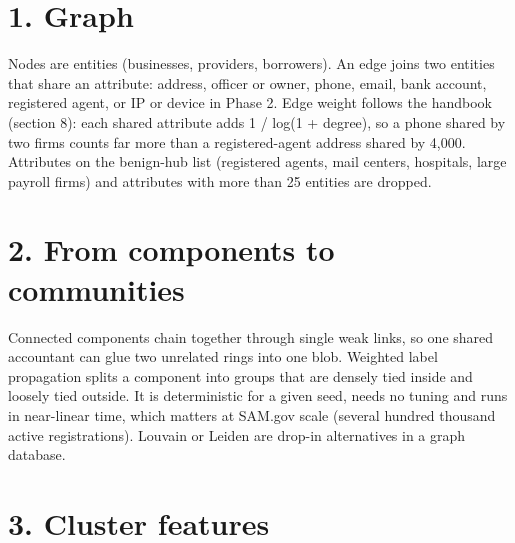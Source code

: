 \documentclass[letterpaper,11pt]{article}
\begin{document}
\hypertarget{graph}{%
\section*{1. Graph}\label{graph}}

Nodes are entities (businesses, providers, borrowers). An edge joins two
entities that share an attribute: address, officer or owner, phone,
email, bank account, registered agent, or IP or device in Phase 2. Edge
weight follows the handbook (section 8): each shared attribute adds 1 /
log(1 + degree), so a phone shared by two firms counts far more than a
registered-agent address shared by 4,000. Attributes on the benign-hub
list (registered agents, mail centers, hospitals, large payroll firms)
and attributes with more than 25 entities are dropped.

\hypertarget{from-components-to-communities}{%
\section*{2. From components to
communities}\label{from-components-to-communities}}

Connected components chain together through single weak links, so one
shared accountant can glue two unrelated rings into one blob. Weighted
label propagation splits a component into groups that are densely tied
inside and loosely tied outside. It is deterministic for a given seed,
needs no tuning and runs in near-linear time, which matters at SAM.gov
scale (several hundred thousand active registrations). Louvain or Leiden
are drop-in alternatives in a graph database.

\hypertarget{cluster-features}{%
\section*{3. Cluster features}\label{cluster-features}}
\end{document}
